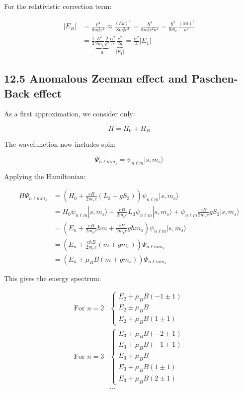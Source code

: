 \documentclass[10pt]{article}
\begin{document}
For the relativistic correction term:

\begin{align*}
|E_R| &= \frac{p^4}{8m_e^3c^2} \approx \frac{(\hbar k)^4}{8m_e^3c^2}=\frac{\hbar^4}{8m_e^3c^2a^4}=\frac{\hbar^2}{8m_e}\frac{(\alpha a)^2}{a^4}\\
&= \frac{1}{4}\underbrace{\frac{\hbar^2}{2m_e}\frac{2}{e^2}}_a\frac{\alpha^2}{a}\underbrace{\frac{e^2}{2a}}_{|E_1|}=\frac{\alpha^2}{4}|E_1| \tag{12.42}
\end{align*}

\subsection*{12.5 Anomalous Zeeman effect and Paschen-Back effect}
As a first approximation, we consider only:

\begin{equation*}
H=H_0+H_B \tag{12.43}
\end{equation*}

The wavefunction now includes spin:

\begin{equation*}
\Psi_{n\ell mm_s}=\psi_{n\ell m}|s,m_s\rangle \tag{12.44}
\end{equation*}

Applying the Hamiltonian:

\begin{align*}
H\Psi_{n\ell mm_s} &= (H_0+\frac{eB}{2m_e c}(L_3+gS_3))\psi_{n\ell m}|s,m_s\rangle\\
&= H_0\psi_{n\ell m}|s,m_s\rangle+\frac{eB}{2m_e c}L_3\psi_{n\ell m}|s,m_s\rangle+\psi_{n\ell m}\frac{eB}{2m_e c}gS_3|s,m_s\rangle\\
&= (E_n+\frac{eB}{2m_e c}\hbar m+\frac{eB}{2m_e c}g\hbar m_s)\psi_{n\ell m}|s,m_s\rangle\\
&= (E_n+\frac{e\hbar B}{2m_e c}(m+gm_s))\Psi_{n\ell mm_s}\\
&= (E_n+\mu_B B(m+gm_s))\Psi_{n\ell mm_s} \tag{12.45}
\end{align*}

This gives the energy spectrum:

\begin{align*}
\text{For } n=2&\left\{\begin{array}{l}
E_2+\mu_B B(-1\pm 1)\\
E_2\pm\mu_B B\\
E_2+\mu_B B(1\pm 1)
\end{array}\right.\\
\text{For } n=3&\left\{\begin{array}{l}
E_3+\mu_B B(-2\pm 1)\\
E_3+\mu_B B(-1\pm 1)\\
E_3\pm\mu_B B\\
E_3+\mu_B B(1\pm 1)\\
E_3+\mu_B B(2\pm 1)
\end{array}\right.\tag{12.46}\\
&\ldots
\end{align*}
\end{document}
